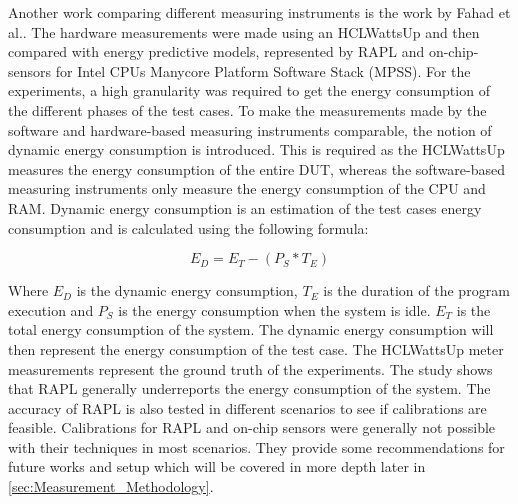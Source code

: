 Another work comparing different measuring instruments is the work by Fahad et al.\cite{fahad2019comparative}. The hardware measurements were made using an HCLWattsUp and then compared with energy predictive models, represented by RAPL and on-chip-sensors for Intel CPUs Manycore Platform Software Stack (MPSS). For the experiments, a high granularity was required to get the energy consumption of the different phases of the test cases. To make the measurements made by the software and hardware-based measuring instruments comparable, the notion of dynamic energy consumption is introduced. This is required as the HCLWattsUp measures the energy consumption of the entire DUT, whereas the software-based measuring instruments only measure the energy consumption of the CPU and RAM. Dynamic energy consumption is an estimation of the test cases energy consumption and is calculated using the following formula:\cite{fahad2019comparative}

\begin{equation}\label{eq:dynamicEnergy}
    E_D = E_T - (P_S * T_E)
\end{equation}

Where $E_D$ is the dynamic energy consumption, $T_E$ is the duration of the program execution and $P_S$ is the energy consumption when the system is idle. $E_T$ is the total energy consumption of the system. The dynamic energy consumption will then represent the energy consumption of the test case. The HCLWattsUp meter measurements represent the ground truth of the experiments. The study shows that RAPL generally underreports the energy consumption of the system. The accuracy of RAPL is also tested in different scenarios to see if calibrations are feasible. Calibrations for RAPL and on-chip sensors were generally not possible with their techniques in most scenarios. They provide some recommendations for future works and setup which will be covered in more depth later in \cref{sec:Measurement_Methodology}.